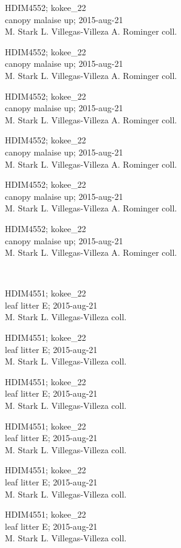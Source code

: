 \documentclass[2pt]{extarticle}
\begin{document}
\noindent
\parbox{0.16\textwidth}{\tiny \raggedright \rule[-0.3\baselineskip]{0pt}{10pt}HDIM4552; kokee\_22\\ canopy malaise up; 2015-aug-21\\ M. Stark L. Villegas-Villeza A. Rominger coll.}
\parbox{0.16\textwidth}{\tiny \raggedright \rule[-0.3\baselineskip]{0pt}{10pt}HDIM4552; kokee\_22\\ canopy malaise up; 2015-aug-21\\ M. Stark L. Villegas-Villeza A. Rominger coll.}
\parbox{0.16\textwidth}{\tiny \raggedright \rule[-0.3\baselineskip]{0pt}{10pt}HDIM4552; kokee\_22\\ canopy malaise up; 2015-aug-21\\ M. Stark L. Villegas-Villeza A. Rominger coll.}
\parbox{0.16\textwidth}{\tiny \raggedright \rule[-0.3\baselineskip]{0pt}{10pt}HDIM4552; kokee\_22\\ canopy malaise up; 2015-aug-21\\ M. Stark L. Villegas-Villeza A. Rominger coll.}
\parbox{0.16\textwidth}{\tiny \raggedright \rule[-0.3\baselineskip]{0pt}{10pt}HDIM4552; kokee\_22\\ canopy malaise up; 2015-aug-21\\ M. Stark L. Villegas-Villeza A. Rominger coll.}
\parbox{0.16\textwidth}{\tiny \raggedright \rule[-0.3\baselineskip]{0pt}{10pt}HDIM4552; kokee\_22\\ canopy malaise up; 2015-aug-21\\ M. Stark L. Villegas-Villeza A. Rominger coll.} \\ 
\vspace{0.001in} 

\noindent
\parbox{0.16\textwidth}{\tiny \raggedright \rule[-0.3\baselineskip]{0pt}{10pt}HDIM4551; kokee\_22\\ leaf litter E; 2015-aug-21\\ M. Stark L. Villegas-Villeza coll.}
\parbox{0.16\textwidth}{\tiny \raggedright \rule[-0.3\baselineskip]{0pt}{10pt}HDIM4551; kokee\_22\\ leaf litter E; 2015-aug-21\\ M. Stark L. Villegas-Villeza coll.}
\parbox{0.16\textwidth}{\tiny \raggedright \rule[-0.3\baselineskip]{0pt}{10pt}HDIM4551; kokee\_22\\ leaf litter E; 2015-aug-21\\ M. Stark L. Villegas-Villeza coll.}
\parbox{0.16\textwidth}{\tiny \raggedright \rule[-0.3\baselineskip]{0pt}{10pt}HDIM4551; kokee\_22\\ leaf litter E; 2015-aug-21\\ M. Stark L. Villegas-Villeza coll.}
\parbox{0.16\textwidth}{\tiny \raggedright \rule[-0.3\baselineskip]{0pt}{10pt}HDIM4551; kokee\_22\\ leaf litter E; 2015-aug-21\\ M. Stark L. Villegas-Villeza coll.}
\parbox{0.16\textwidth}{\tiny \raggedright \rule[-0.3\baselineskip]{0pt}{10pt}HDIM4551; kokee\_22\\ leaf litter E; 2015-aug-21\\ M. Stark L. Villegas-Villeza coll.} \\ 
\vspace{0.001in} 
\end{document}

